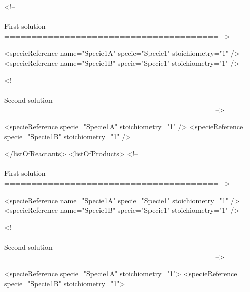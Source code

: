 \documentclass{cekarticle}
\newenvironment{changemargin}[2]{\begin{list}{}{%
\setlength{\leftmargin}{0pt}%
\setlength{\rightmargin}{0pt}%
\setlength{\listparindent}{\parindent}%
\setlength{\itemindent}{\parindent}%
\addtolength{\leftmargin}{#1}%
\addtolength{\rightmargin}{#2}%
}\item }{\end{list}}
\begin{document}
\begin{changemargin}{-2cm}{0cm}
\begin{example}
<!-- ============================================ First solution ======================================= -->

                        <specieReference name="Specie1A" specie="Specie1" stoichiometry="1" />
                        <specieReference name="Specie1B" specie="Specie1" stoichiometry="1" />

<!-- ============================================ Second solution ====================================== -->

                        <specieReference specie="Specie1A" stoichiometry="1" />
                        <specieReference specie="Specie1B" stoichiometry="1" />

                    </listOfReactants>
                    <listOfProducts>
<!-- ============================================ First solution ======================================= -->

                        <specieReference name="Specie1A" specie="Specie1" stoichiometry="1" />
                        <specieReference name="Specie1B" specie="Specie1" stoichiometry="1" />

<!-- ============================================ Second solution ====================================== -->

                        <specieReference specie="Specie1A" stoichiometry="1">
                        <specieReference specie="Specie1B" stoichiometry="1">


\end{example}
\end{changemargin}
\end{document}
